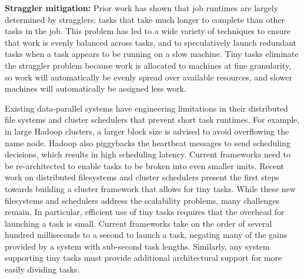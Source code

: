 \vspace{4pt}\noindent\textbf{Straggler mitigation:}
Prior work has shown that job runtimes are largely determined by
stragglers: tasks that take much longer to complete than other tasks in the
job. This problem has led to a wide variety of techniques to ensure that
work is evenly balanced across tasks, and to speculatively launch
redundant tasks when a task appears to be running on a slow machine.
Tiny tasks eliminate the straggler problem because work is allocated to
machines at fine granularity, so work will automatically be evenly spread
over available resources, and slower machines will automatically be assigned
less work.

Existing data-parallel systems have engineering limitations in their distributed
file systems and cluster schedulers that prevent short task runtimes. For example, in
large Hadoop clusters, a larger block size is advised to avoid overflowing the name node.
Hadoop also piggybacks the heartbeat messages to send scheduling decisions, which
results in high scheduling latency.
Current frameworks need to be re-architected to enable tasks to be broken into even smaller
units.
Recent work on distributed filesystems\cite{nightingale2012flat} and cluster
schedulers\cite{ousterhoutbatch} present the first steps towards
building a cluster framework that allows for tiny tasks. While these new filesystems
and schedulers address the scalability problems, many challenges remain. In particular,
efficient use of tiny tasks requires that the overhead for launching a task is small. Current
frameworks take on the order of several hundred milliseconds to a second to launch a task, negating
many of the gains provided by a system with sub-second task lengths. Similarly, any system
supporting tiny tasks must provide additional architectural support for more easily dividing tasks.

